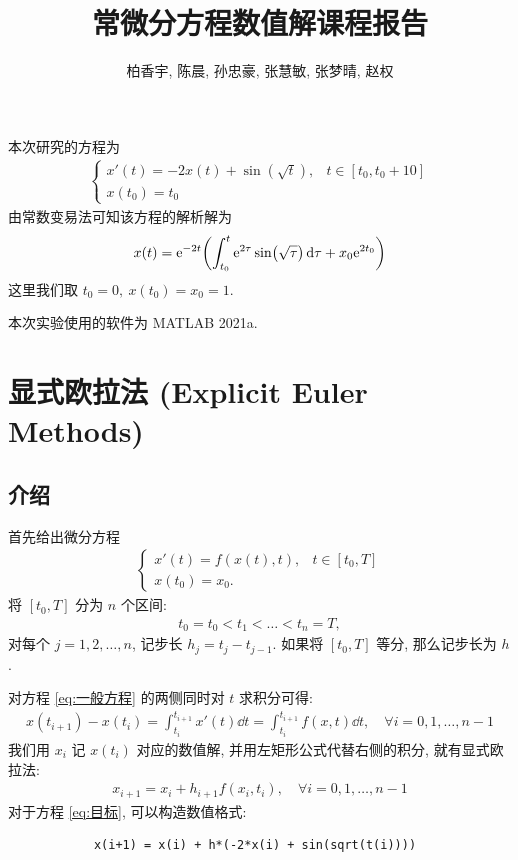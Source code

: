 \documentclass[twoside]{ctexart}
\title{常微分方程数值解课程报告}
\author{柏香宇, 陈晨, 孙忠豪, 张慧敏, 张梦晴, 赵权}
\date{}
\begin{document}
    \maketitle
    \tableofcontents
    \clearpage
    本次研究的方程为
    \begin{align}\label{eq:目标}
        \begin{cases}
            x'(t) = -2x(t) + \sin(\sqrt{t}), & t\in [t_{0}, t_{0}+10]\\
            x(t_{0}) = t_{0}
        \end{cases}
    \end{align}
    由常数变易法可知该方程的解析解为 
    \begin{align*}
        x(t) = \mathrm{e}^{-2t}\qty(\int_{t_{0}}^{t}\mathrm{e}^{2\tau}\sin(\sqrt{\tau})\dd{\tau} + x_{0}\mathrm{e}^{2t_{0}})
    \end{align*}
    这里我们取 $ t_{0}=0,\ x(t_{0})=x_{0}=1 $.

    本次实验使用的软件为 MATLAB 2021a.

    \section{显式欧拉法 (Explicit Euler Methods)}
    \subsection{介绍}
    首先给出微分方程
    \begin{align}\label{eq:一般方程}
        \begin{cases}
            x'(t)=f(x(t), t), & t\in[t_{0}, T]\\
            x(t_{0})=x_{0}.
        \end{cases}
    \end{align} 
    将 $ [t_{0}, T] $ 分为 $ n $ 个区间:
    \begin{align*}
        t_{0}=t_{0}<t_{1}<\dots<t_{n}=T,
    \end{align*}  
    对每个 $ j=1, 2, \dots, n $, 记步长 $ h_{j}=t_{j}-t_{j-1} $. 如果将 $ [t_{0}, T] $ 等分, 那么记步长为 $ h $.
    
    对方程 \eqref{eq:一般方程} 的两侧同时对 $ t $ 求积分可得:
    \begin{align*}
        x(t_{i+1})-x(t_{i})=\int_{t_{i}}^{t_{i+1}}x'(t)\dd{t} = \int_{t_{i}}^{t_{i+1}} f(x, t)\dd{t},\quad \forall i=0, 1, \dots, n-1
    \end{align*} 
    我们用 $ x_{i} $ 记 $ x(t_{i}) $ 对应的数值解, 并用左矩形公式代替右侧的积分, 就有显式欧拉法:
    \begin{align}
        x_{i+1} = x_{i} + h_{i+1}f(x_{i}, t_{i}), \quad \forall i=0, 1, \dots, n-1
    \end{align}
    对于方程 \eqref{eq:目标}, 可以构造数值格式:
    \begin{verbatim}
            x(i+1) = x(i) + h*(-2*x(i) + sin(sqrt(t(i))))
    \end{verbatim}
\end{document}
